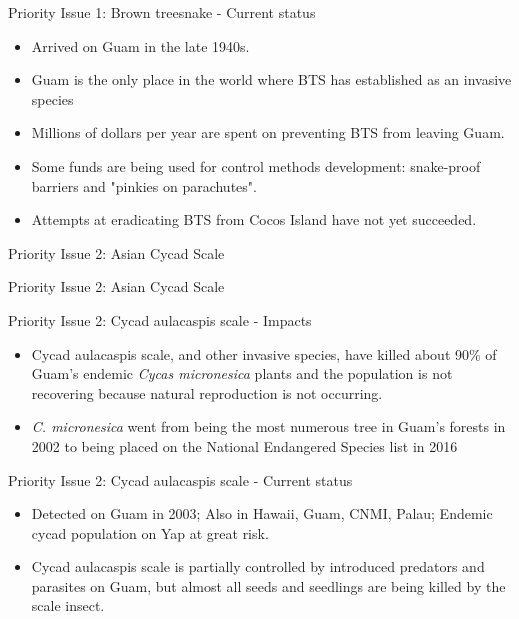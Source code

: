 \documentclass[]{beamer}
\begin{document}
\begin{frame}{Priority Issue 1: Brown treesnake - Current status}
\begin{itemize}
	\item Arrived on Guam in the late 1940s.
	\item Guam is the only place in the world where BTS has established as an invasive species
	\item Millions of dollars per year are spent on preventing BTS from leaving Guam.
	\item Some funds are being used for control methods development: snake-proof barriers and "pinkies on parachutes".
	\item Attempts at eradicating BTS from Cocos Island have not yet succeeded.
\end{itemize}	
\end{frame}

\begin{frame}{Priority Issue 2: Asian Cycad Scale}
\end{frame}

\begin{frame}{Priority Issue 2: Asian Cycad Scale}
\end{frame}

\begin{frame}{Priority Issue 2: Cycad aulacaspis scale - Impacts}
	\begin{itemize}
		\item Cycad aulacaspis scale, and other invasive species, have killed about 90\% of Guam's endemic \textit{Cycas micronesica} plants and the population is not recovering because natural reproduction is not occurring.
		\item{\textit{C. micronesica} went from being the most numerous tree in Guam's forests in 2002 to being placed on the National Endangered Species list in 2016}
	\end{itemize}
\end{frame}

\begin{frame}{Priority Issue 2: Cycad aulacaspis scale - Current status}
\begin{itemize}
	\item Detected on Guam in 2003; Also in Hawaii, Guam, CNMI, Palau; Endemic cycad population on Yap at great risk.
	\item Cycad aulacaspis scale is partially controlled by introduced predators and parasites on Guam, but almost all seeds and seedlings are being killed by the scale insect.
\end{itemize}	
\end{frame}
\end{document}
